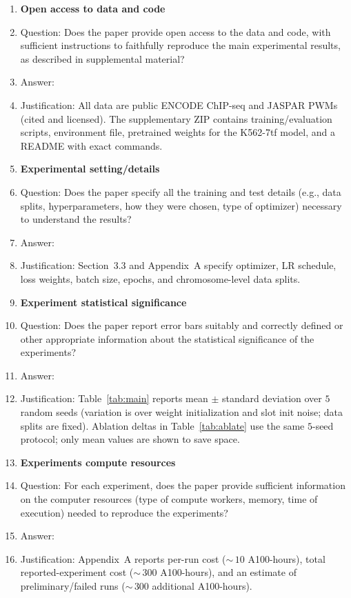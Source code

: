 \begin{enumerate}
\item {\bf Open access to data and code}
    \item[] Question: Does the paper provide open access to the data and code, with sufficient instructions to faithfully reproduce the main experimental results, as described in supplemental material?
    \item[] Answer: \answerYes{}
    \item[] Justification: All data are public ENCODE ChIP-seq and JASPAR PWMs (cited and licensed). The supplementary ZIP contains training/evaluation scripts, environment file, pretrained weights for the K562-7tf model, and a README with exact commands.

\item {\bf Experimental setting/details}
    \item[] Question: Does the paper specify all the training and test details (e.g., data splits, hyperparameters, how they were chosen, type of optimizer) necessary to understand the results?
    \item[] Answer: \answerYes{}
    \item[] Justification: Section~3.3 and Appendix~A specify optimizer, LR schedule, loss weights, batch size, epochs, and chromosome-level data splits.

\item {\bf Experiment statistical significance}
    \item[] Question: Does the paper report error bars suitably and correctly defined or other appropriate information about the statistical significance of the experiments?
    \item[] Answer: \answerYes{}
    \item[] Justification: Table~\ref{tab:main} reports mean $\pm$ standard deviation over $5$ random seeds (variation is over weight initialization and slot init noise; data splits are fixed). Ablation deltas in Table~\ref{tab:ablate} use the same $5$-seed protocol; only mean values are shown to save space.

\item {\bf Experiments compute resources}
    \item[] Question: For each experiment, does the paper provide sufficient information on the computer resources (type of compute workers, memory, time of execution) needed to reproduce the experiments?
    \item[] Answer: \answerYes{}
    \item[] Justification: Appendix~A reports per-run cost ($\sim$\,$10$ A100-hours), total reported-experiment cost ($\sim$\,$300$ A100-hours), and an estimate of preliminary/failed runs ($\sim$\,$300$ additional A100-hours).


\end{enumerate}
